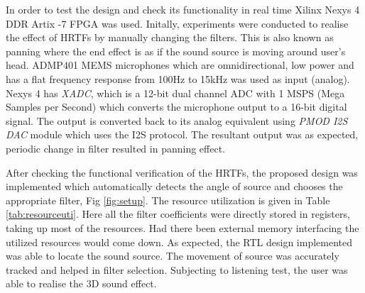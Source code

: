 \documentclass[conference]{IEEEtran}
\begin{document}
In order to test the design and check its functionality in real time Xilinx Nexys 4 DDR Artix -7 FPGA was used. Initally, experiments were conducted to realise the effect of HRTFs by manually changing the filters. This is also known as panning where the end effect is as if the sound source is moving around user's head. ADMP401 MEMS microphones which are omnidirectional, low power and has a flat frequency response from 100Hz to 15kHz was used as input (analog). Nexys 4 has \textit{XADC}, which is a 12-bit dual channel ADC with 1 MSPS (Mega Samples per Second) which converts the microphone output to a 16-bit digital signal. The output is converted back to its analog equivalent using \textit{PMOD I2S DAC} module which uses the I2S protocol. The resultant output was as expected, periodic change in filter resulted in panning effect.

After checking the functional verification of the HRTFs, the proposed design was implemented which automatically detects the angle of source and chooses the appropriate filter, Fig \ref{fig:setup}.
The resource utilization is given in Table \ref{tab:resourceuti}. Here all the filter coefficients were directly stored in registers, taking up most of the resources. Had there been external memory interfacing the utilized resources would come down.  As expected, the RTL design implemented was able to locate the sound source. The movement of source was accurately tracked and helped in filter selection. Subjecting to listening test, the user was able to realise the 3D sound effect. \newline
\end{document}
